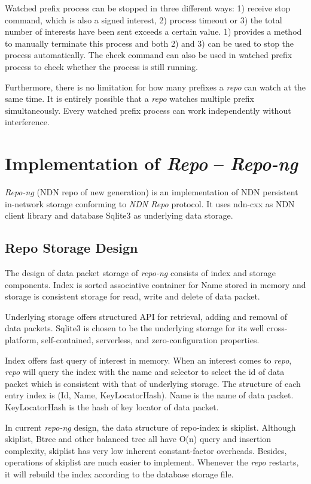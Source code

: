 \documentclass[conference]{IEEEtran}
\begin{document}
Watched prefix process can be stopped in three different ways: 1) receive stop command, which is also a signed interest, 2) process timeout or 3) the total number of interests have been sent exceeds a certain value. 1) provides a method to manually terminate this process and both 2) and 3) can be used to stop the process automatically. The check command can also be used in watched prefix process to check whether the process is still running.

Furthermore, there is no limitation for how many prefixes a \emph{repo} can watch at the same time. It is entirely possible that a \emph{repo} watches multiple prefix simultaneously. Every watched prefix process can work independently without interference.

\section{Implementation of \emph{Repo} -- \emph{Repo-ng}} \label{section-implementation}
\emph{Repo-ng} (NDN repo of new generation) is an implementation of NDN persistent in-network storage conforming to \emph{NDN Repo} protocol. It uses ndn-cxx as NDN client library and database Sqlite3 as underlying data storage.

\subsection{Repo Storage Design}

The design of data packet storage of \emph{repo-ng} consists of index and storage components. Index is sorted associative container for Name stored in memory and storage is consistent storage for read, write and delete of data packet.

Underlying storage offers structured API for retrieval, adding and removal of data packets. Sqlite3 is chosen to be the underlying storage for its well cross-platform, self-contained, serverless, and zero-configuration properties.

Index offers fast query of interest in memory. When an interest comes to \emph{repo}, \emph{repo} will query the index with the name and selector to select the id of data packet which is consistent with that of underlying storage. The structure of each entry index is (Id, Name, KeyLocatorHash). Name is the name of data packet. KeyLocatorHash is the hash of key locator of data packet.

In current \emph{repo-ng} design, the data structure of repo-index is skiplist. Although skiplist, Btree and other balanced tree all have O(n) query and insertion complexity, skiplist has very low inherent constant-factor overheads. Besides, operations of skiplist are much easier to implement. \cite{pugh1990skip} Whenever the \emph{repo} restarts, it will rebuild the index according to the database storage file.
\end{document}
